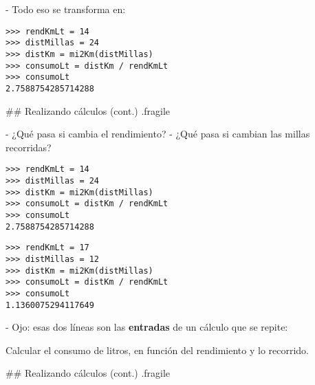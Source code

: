 \trmcolumns

\pause

- Todo eso se transforma en:

\vspace{-2ex}

\bgncolumns
{}
\begin{lstlisting}[linebackgroundcolor={%
        \btLstHL{3}%
}]
>>> rendKmLt = 14
>>> distMillas = 24
>>> distKm = mi2Km(distMillas)
>>> consumoLt = distKm / rendKmLt
>>> consumoLt
2.7588754285714288
\end{lstlisting}


\trmcolumns

## Realizando cálculos (cont.) {.fragile}

\bgnblocknormal

- ¿Qué pasa si cambia el rendimiento?
- ¿Qué pasa si cambian las millas recorridas?

\trmblocknormal

\bgncolumns
{}
\begin{lstlisting}[linebackgroundcolor={%
        \btLstHL{1-2}%
}]
>>> rendKmLt = 14
>>> distMillas = 24
>>> distKm = mi2Km(distMillas)
>>> consumoLt = distKm / rendKmLt
>>> consumoLt
2.7588754285714288
\end{lstlisting}

\begin{lstlisting}[linebackgroundcolor={\btLstHL{1-2}}]
>>> rendKmLt = 17
>>> distMillas = 12
>>> distKm = mi2Km(distMillas)
>>> consumoLt = distKm / rendKmLt
>>> consumoLt
1.1360075294117649
\end{lstlisting}

\trmcolumns

\bgncolumns
{}

- Ojo: esas dos líneas son las \textbf{entradas} de un cálculo que se repite:



\bgnblocknormal
Calcular el consumo de litros, en función del rendimiento y lo recorrido.
\trmblocknormal

\trmcolumns

## Realizando cálculos (cont.) {.fragile}

\vspace*{-3ex}
\bgncolumns

